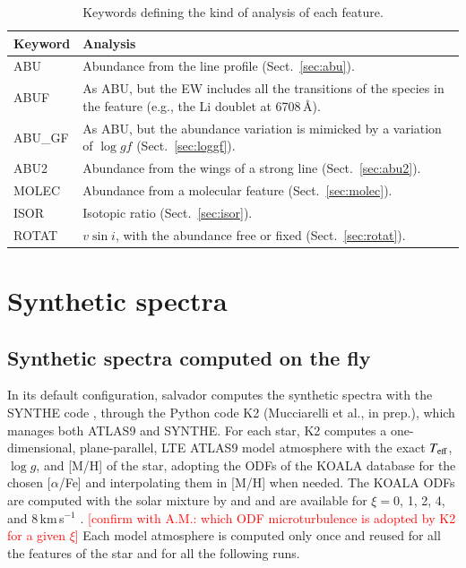 \documentclass{aa}
\newcommand{\todo}[1]{\textcolor{red}{[#1]}}
\newcommand{\salvador}{salvador}   %
\begin{document}
\begin{table}
\caption{Keywords defining the kind of analysis of each feature.}
\label{tab:keywords}
\centering
\begin{tabular}{l >{\raggedright\arraybackslash}p{6.0cm}}
\hline\hline
Keyword & Analysis \\
\hline
ABU    & Abundance from the line profile (Sect.~\ref{sec:abu}). \\
ABUF   & As ABU, but the EW includes all the transitions of the species
         in the feature (e.g., the Li doublet at 6708\,\AA). \\
ABU\_GF & As ABU, but the abundance variation is mimicked by a
          variation of $\log gf$ (Sect.~\ref{sec:loggf}). \\
ABU2   & Abundance from the wings of a strong line
         (Sect.~\ref{sec:abu2}). \\
MOLEC  & Abundance from a molecular feature
         (Sect.~\ref{sec:molec}). \\
ISOR   & Isotopic ratio (Sect.~\ref{sec:isor}). \\
ROTAT  & $v\sin i$, with the abundance free or fixed
         (Sect.~\ref{sec:rotat}). \\
\hline
\end{tabular}
\end{table}

\section{Synthetic spectra}
\label{sec:synth}

\subsection{Synthetic spectra computed on the fly}
\label{sec:synth_k2}

In its default configuration, \salvador{} computes the synthetic
spectra with the SYNTHE code \citep{Kurucz1993b, Sbordone2004,
Kurucz2005}, through the Python code K2 (Mucciarelli et al., in
prep.), which manages both ATLAS9 and SYNTHE. For each star, K2
computes a one-dimensional, plane-parallel, LTE ATLAS9 model
atmosphere \citep{Kurucz1993, Kurucz2005} with the exact $T_{\rm
eff}$, $\log g$, and [M/H] of the star, adopting the ODFs of the
KOALA database \citep{Mucciarelli2026} for the chosen [$\alpha$/Fe]
and interpolating them in [M/H] when needed. The KOALA ODFs are
computed with the solar mixture by \citet{Caffau2011} and
\citet{Lodders2010} and are available for $\xi=0$, 1, 2, 4, and
8\,km\,s$^{-1}$ \citep{Mucciarelli2026}. \todo{confirm with A.M.:
which ODF microturbulence is adopted by K2 for a given $\xi$} Each
model atmosphere is computed only once and reused for all the
features of the star and for all the following runs.
\end{document}

